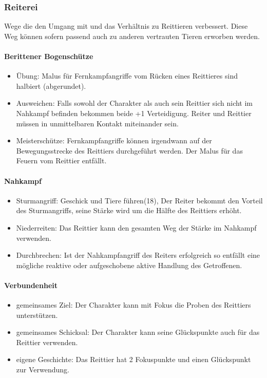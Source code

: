 \documentclass{article}
\begin{document}
\subsubsection{Reiterei}

Wege die den Umgang mit und das Verhältnis zu Reittieren verbessert. Diese Weg können sofern passend auch zu anderen
vertrauten Tieren erworben werden.

\paragraph{Berittener Bogenschütze}

\begin{itemize}
\item Übung: Malus für Fernkampfangriffe vom Rücken eines Reittieres sind halbiert (abgerundet).
\item Ausweichen: Falls sowohl der Charakter als auch sein Reittier sich nicht im Nahkampf befinden bekommen beide +1 Verteidigung. Reiter und Reittier müssen in unmittelbaren Kontakt miteinander sein.
\item Meisterschütze: Fernkampfangriffe können irgendwann auf der Bewegungsstrecke des Reittiers durchgeführt werden. Der Malus für das Feuern vom Reittier entfällt.
\end{itemize}

\paragraph{Nahkampf}

\begin{itemize}
\item Sturmangriff: Geschick und Tiere führen(18), Der Reiter bekommt den Vorteil des Sturmangriffs, seine Stärke wird um die Hälfte des Reittiers erhöht.
\item Niederreiten: Das Reittier kann den gesamten Weg der Stärke im Nahkampf verwenden.
\item Durchbrechen: Ist der Nahkampfangriff des Reiters erfolgreich so entfällt eine mögliche reaktive oder aufgeschobene aktive Handlung des Getroffenen.
\end{itemize}

\paragraph{Verbundenheit}

\begin{itemize}
\item gemeinsames Ziel: Der Charakter kann mit Fokus die Proben des Reittiers unterstützen.
\item gemeinsames Schicksal: Der Charakter kann seine Glückspunkte auch für das Reittier verwenden.
\item eigene Geschichte: Das Reittier hat 2 Fokuspunkte und einen Glückspunkt zur Verwendung.
\end{itemize}
\end{document}
